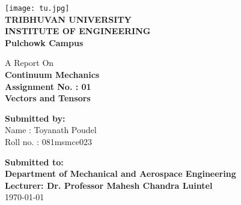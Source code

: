 



  \begin{center}
  
    \texttt{[image: tu.jpg]}\\[0.8cm]

    \LARGE\textbf{TRIBHUVAN UNIVERSITY}\\[0.3cm]
    \Large\textbf{INSTITUTE OF ENGINEERING}\\[0.2cm]
    \textbf{Pulchowk Campus}\\[0.4cm]
    \vspace{0.3cm}

    A Report On\\
    \LARGE\textbf{Continuum Mechanics}\\[0.3cm]
    \large\textbf{Assignment No. : 01\\[0.1cm]
    Vectors and Tensors\\[0.1cm]}

    \vspace{1.2cm}

    \textbf{Submitted by:}\\
    \large{
      Name : Toyanath Poudel\\
      Roll no. : 081msmce023\\}

    \vspace{1.2cm}

    \textbf{Submitted to:}\\
    \textbf{
      Department of Mechanical and Aerospace Engineering\\
      Lecturer: Dr. Professor Mahesh Chandra Luintel
    }\\[0.2cm]
    {\large \today}

    \vspace*{\fill}
  \end{center}

